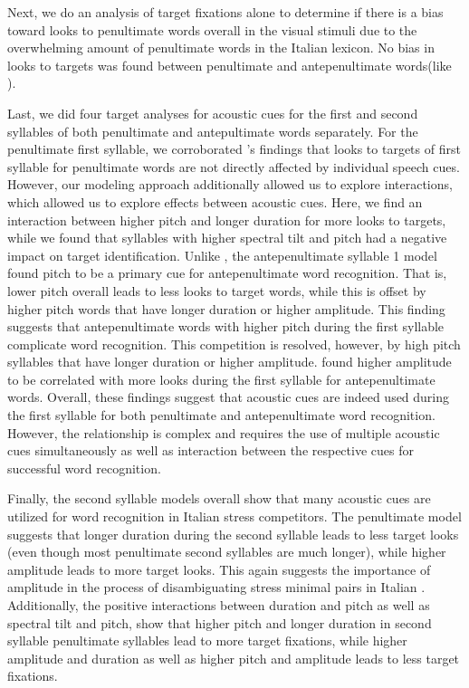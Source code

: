 Next, we do an analysis of target fixations alone to determine if there is a bias toward looks to penultimate words overall in the visual stimuli due to the overwhelming amount of penultimate words in the Italian lexicon. No bias in looks to targets was found between penultimate and antepenultimate words(like \cite{Sulpizio_McQueen_2012}).

Last, we did four target analyses for acoustic cues for the first and second syllables of both penultimate and antepultimate words separately. 
For the penultimate first syllable, we corroborated \cite{Sulpizio_McQueen_2012}'s findings that looks to targets of first syllable for penultimate words are not directly affected by individual speech cues. However, our modeling approach additionally allowed us to explore interactions, which allowed us to explore effects between acoustic cues. Here, we find an interaction between higher pitch and longer duration for more looks to targets, while we found that syllables with higher spectral tilt and pitch had a negative impact on target identification. Unlike \cite{Sulpizio_McQueen_2012}, the antepenultimate syllable 1 model found pitch to be a primary cue for antepenultimate word recognition. That is, lower pitch overall leads to less looks to target words, while this is offset by higher pitch words that have longer duration or higher amplitude. This finding suggests that antepenultimate words with higher pitch during the first syllable complicate word recognition. This competition is resolved, however, by high pitch syllables that have longer duration or higher amplitude. \cite{Sulpizio_McQueen_2012} found higher amplitude to be correlated with more looks during the first syllable for antepenultimate words. Overall, these findings suggest that acoustic cues are indeed used during the first syllable for both penultimate and antepenultimate word recognition. However, the relationship is complex and requires the use of multiple acoustic cues simultaneously as well as interaction between the respective cues for successful word recognition.

Finally, the second syllable models overall show that many acoustic cues are utilized for word recognition in Italian stress competitors. The penultimate model suggests that longer duration during the second syllable leads to less target looks (even though most penultimate second syllables are much longer), while higher amplitude leads to more target looks. This again suggests the importance of amplitude in the process of disambiguating stress minimal pairs in Italian \citep{Sulpizio_McQueen_2012}. Additionally, the positive interactions between duration and pitch as well as spectral tilt and pitch, show that higher pitch and longer duration in second syllable penultimate syllables lead to more target fixations, while higher amplitude and duration as well as higher pitch and amplitude leads to less target fixations.


